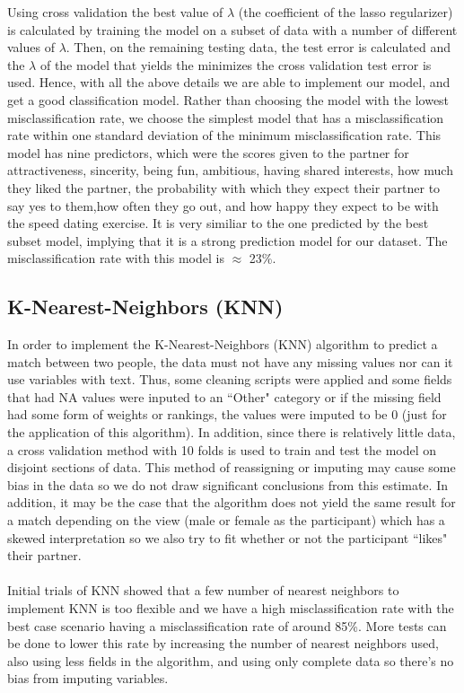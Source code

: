 \documentclass{article}
\begin{document}
Using cross validation the best value of $\lambda$ (the coefficient of the lasso regularizer) is calculated by training the model on a subset of data with a number of different values of $\lambda$.  Then, on the remaining testing data, the test error is calculated and the $\lambda$ of the model that yields the minimizes the cross validation test error is used. Hence, with all the above details we are able to implement our model, and get a good classification model. Rather than choosing the model with the lowest misclassification rate, we choose the simplest model that has a misclassification rate within one standard deviation of the minimum misclassification rate. This model has nine predictors, which were the scores given to the partner for attractiveness, sincerity, being fun, ambitious, having shared interests, how much they liked the partner, the probability with which they expect their partner to say yes to them,how often they go out, and how happy they expect to be with the speed dating exercise. It is very similiar to the one predicted by the best subset model, implying that it is a strong prediction model for our dataset. The misclassification rate with this model is $\approx$ 23\%.
%
\subsection{K-Nearest-Neighbors (KNN)}
\label{sec:KNN}
In order to implement the K-Nearest-Neighbors (KNN) algorithm to predict a match between two people, the data must not have any missing values nor can it use variables with text.  Thus, some cleaning scripts were applied and some fields that had NA values were inputed to an ``Other" category or if the missing field had some form of weights or rankings, the values were imputed to be 0 (just for the application of this algorithm).  In addition, since there is relatively little data, a cross validation method with 10 folds is used to train and test the model on disjoint sections of data.  This method of reassigning or imputing may cause some bias in the data so we do not draw significant conclusions from this estimate.  In addition, it may be the case that the algorithm does not yield the same result for a match depending on the view (male or female as the participant) which has a skewed interpretation so we also try to fit whether or not the participant ``likes" their partner.\\
\null\\
Initial trials of KNN showed that a few number of nearest neighbors to implement KNN is too flexible and we have a high misclassification rate with the best case scenario having a misclassification rate of around 85\%.  More tests can be done to lower this rate by increasing the number of nearest neighbors used, also using less fields in the algorithm, and using only complete data so there's no bias from imputing variables.
%
\end{document}
